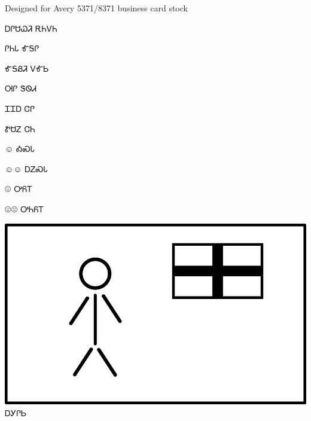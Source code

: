\documentclass[avery5371]{flashcards}%
\begin{document}
    Designed for Avery 5371/8371 business card stock


    \begin{flashcard}{\Huge ᎠᎵᏌᏇᏘ}
        \textbf{\Huge} ᎡᏂᏙᏂ
    \end{flashcard}

    \begin{flashcard}{\Huge ᎵᏂᏓ}
        \textbf{\Huge} ᎹᎦᎵ
    \end{flashcard}

    \begin{flashcard}{\Huge ᎹᎦᏰᏘ}
        \textbf{\Huge} ᏙᎹᏏ
    \end{flashcard}

    \begin{flashcard}{\Huge ᎺᎵ}
        \textbf{\Huge} ᏕᏫᏗ
    \end{flashcard}

    \begin{flashcard}{\Huge ᏆᏆᎠ}
        \textbf{\Huge} ᏣᎵ
    \end{flashcard}

    \begin{flashcard}{\Huge ᏑᏌᏃ}
        \textbf{\Huge} ᏣᏂ
    \end{flashcard}


    \begin{flashcard}{\normalfont\Huge\fontsize{128pt}{128pt}\selectfont ☺}
        \Huge ᎣᏍᏓ
    \end{flashcard}

    \begin{flashcard}{\normalfont\Huge\fontsize{128pt}{128pt}\selectfont ☺☺}
        \Huge ᎠᏃᏍᏓ
    \end{flashcard}

    \begin{flashcard}{\normalfont\Huge\fontsize{128pt}{128pt}\selectfont ☹}
        \Huge ᎤᏲᎢ
    \end{flashcard}

    \begin{flashcard}{\normalfont\Huge\fontsize{128pt}{128pt}\selectfont ☹☹}
        \Huge ᎤᏂᏲᎢ
    \end{flashcard}


    \begin{flashcard}{
        \includegraphics[width=0.95\columnwidth,height=.51\columnwidth,keepaspectratio]{../artwork/flags/agilisi-flag}
    }
        \Huge ᎠᎩᎵᏏ
    \end{flashcard}
\end{document}
